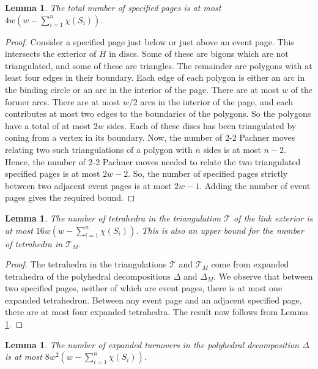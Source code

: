 \documentclass[oneside]{amsart}
\numberwithin{equation}{section}
\theoremstyle{plain}
\newtheorem{lemma}[equation]{Lemma}
\theoremstyle{definition}
\newcommand{\calT}{{\mathcal{T}}}
\begin{document}
\begin{lemma}
\label{Lem:NumberSpecifiedLevels}
The total number of specified pages is at most
$4w(w -  \sum_{i=1}^n \chi(S_i))$.
\end{lemma}

\begin{proof}
Consider a specified page just below or just above an event page. This intersects the exterior of $H$
in discs. Some of these are bigons which are not triangulated, and some of these are triangles. The remainder
are polygons with at least four edges in their boundary. Each edge of each polygon is either an arc in the binding
circle or an arc in the interior of the page. There are at most $w$ of the former arcs. There are at most
$w/2$ arcs in the interior of the page, and each contributes at most two edges to the boundaries
of the polygons. So the polygons have a total of at most $2w$ sides.
Each of these discs has been triangulated by coning from a vertex in its boundary.
Now, the number of 2-2 Pachner moves relating two such triangulations
of a polygon with $n$ sides is at most $n-2$. Hence, the number of 2-2 Pachner moves
needed to relate the two triangulated specified pages is at most $2w-2$. So, the number
of specified pages strictly between two adjacent event pages is at most $2w-1$.
Adding the number of event pages gives the required bound.
\end{proof}

\begin{lemma}
\label{Lem:NumberTetrahedra}
The number of tetrahedra in the triangulation $\mathcal{T}$ of the link exterior
is at most $16w (w - \sum_{i=1}^n \chi(S_i))$. This is also an upper bound for the number
of tetrahedra in $\calT_M$.
\end{lemma}

\begin{proof}
The tetrahedra in the triangulations $\mathcal{T}$ and $\calT_M$ come from expanded tetrahedra of
the polyhedral decompositions $\Delta$ and $\Delta_M$.
We observe that between two specified pages, neither of which are event pages,
there is at most one expanded tetrahedron. Between any event page and an adjacent
specified page, there are at most four expanded tetrahedra. The result now follows from
Lemma \ref{Lem:NumberSpecifiedLevels}.
\end{proof}

\begin{lemma}
\label{Lem:NumberExpandedTurnover}
The number of expanded turnovers in the polyhedral decomposition $\Delta$ is at most $8w^2 (w - \sum_{i=1}^n \chi(S_i))$.
\end{lemma}
\end{document}
